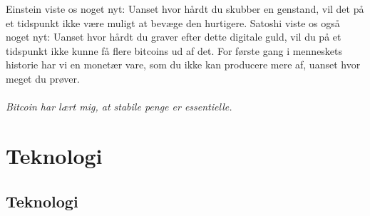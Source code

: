 \documentclass[paper=6in:9in,pagesize=pdftex,
               headinclude=on,footinclude=on,12pt]{scrbook}
\begin{document}
Einstein viste os noget nyt: Uanset hvor hårdt du skubber en genstand, vil det på et tidspunkt ikke være muligt at bevæge den hurtigere. Satoshi viste os også noget nyt: Uanset hvor hårdt du graver efter dette digitale guld, vil du på et tidspunkt ikke kunne få flere bitcoins ud af det. For første gang i menneskets historie har vi en monetær vare, som du ikke kan producere mere af, uanset hvor meget du prøver.\paragraph{Bitcoin har lært mig, at stabile penge er essentielle.}%
%
%
%
%
%
%
%
%

\part{Teknologi}
\label{ch:technology}
\chapter*{Teknologi}
\end{document}
